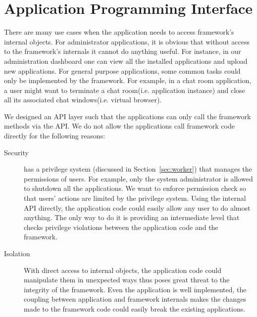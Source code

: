 \chapter{Application Programming Interface}
\label{ch:api}


There are many use cases when the application needs
to access framework's internal objects.
For administrator applications,
it is obvious that without access to the framework's internals
it cannot do anything useful.
For instance, in our administration dashboard one can
view all the installed applications and upload new applications.
For general purpose applications,
some common tasks could only be implemented by the framework.
For example,
in a chat room application,
a user might want to terminate a chat room(i.e. application instance)
and close all its associated chat windows(i.e. virtual browser).

We designed an API layer such that the applications can only call
the framework methods via the API.
We do not allow the applications call framework code directly for the
following reasons:

\begin{description}

\item[Security] \cb has a privilege system (discussed in
Section~\ref{sec:worker})  that manages the permissions of users. For example,
only the system administrator is allowed to shutdown all the  applications. We
want to enforce permission check so that users' actions  are limited by the
privilege system. Using the internal API directly, the application code could
easily allow any user to do almost anything. The only way to do it is
providing an intermediate level  that checks privilege violations between the
application code and the framework.

\item[Isolation] With direct access to internal objects, the application  code
could manipulate them in unexpected ways thus poses great threat to  the
integrity of the framework. Even the application is well implemented, the
coupling between application and framework internals makes the changes made to
the framework code could easily break the existing applications.
\end{description}


